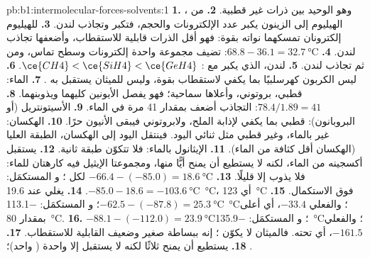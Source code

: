 \begin{solution}{pb:b1:intermolecular-forces-solvents:1}
\textbf{1.} ، وهو الوحيد بين ذرات غير قطبية.
\textbf{2.} من الهيليوم إلى الزينون يكبر عدد الإلكترونات والحجم،
فتكبر  وتجاذب لندن.
\textbf{3.} للهيليوم إلكترونان تمسكهما نواته بقوة: فهو
أقل الذرات قابلية للاستقطاب، وأضعفها تجاذب لندن.
\textbf{4.} $68.8 - 36.1 = \qty{32.7}{\celsius}$: تضيف مجموعة  واحدة
إلكترونات وسطح تماس، ومن ثم تجاذب لندن.
\textbf{5.} لندن، الذي يكبر مع : $\ce{CH4} < \ce{SiH4} <
\ce{GeH4}$.
\textbf{6.} ليس الكربون كهرسلبيًا بما يكفي لاستقطاب 
بقوة، وليس للميثان  يستقبل به .
\textbf{7.} الماء: قطبي، بروتوني، وأعلاها سماحية؛ فهو
يفصل الأيونين كليهما ويذوبنهما.
\textbf{8.} $78.4/1.89 = 41$: التجاذب أضعف بمقدار 41 مرة في الماء.
\textbf{9.} الأسيتونتريل (أو البروبانون): قطبي بما يكفي لإذابة الملح،
ولابروتوني فيبقى الأنيون حرًا.
\textbf{10.} الهكسان: غير  بالماء، وغير قطبي مثل ثنائي اليود. فينتقل اليود
إلى الهكسان، الطبقة العليا (الهكسان أقل كثافة من الماء).
\textbf{11.} الإيثانول  بالماء: فلا تتكوّن طبقة ثانية.
\textbf{12.} يستقبل أكسجينه  من الماء، لكنه لا يستطيع
أن يمنح أيًّا منها، ومجموعتا الإيثيل فيه كارهتان للماء: فلا يذوب إلا
قليلًا.
\textbf{13.} $-66.4 - (-85.0) = \qty{18.6}{\celsius}$ لكل ؛
و المستكمَل: $-85.0 - 18.6 = \qty{-103.6}{\celsius}$.
\textbf{14.} يغلي  عند \qty{19.6}{\celsius}، أي \qty{123}{\celsius}
فوق الاستكمال.
\textbf{15.} $-62.5 - (-87.8) = \qty{25.3}{\celsius}$؛ و
المستكمَل: \qty{-113.1}{\celsius}؛ والفعلي $-33.4$، أي أعلى بمقدار \qty{80}{\celsius}.
\textbf{16.} $-88.1 - (-112.0) = \qty{23.9}{\celsius}$؛ و
المستكمَل: \qty{-135.9}{\celsius}؛ والفعلي $-161.5$، أي تحته. فالميثان لا يكوّن
؛ إنه ببساطة صغير وضعيف القابلية للاستقطاب.
\textbf{17.} .
\textbf{18.} يستطيع  أن يمنح ثلاثًا لكنه لا يستقبل إلا واحدة ( واحد)؛

\end{solution}
